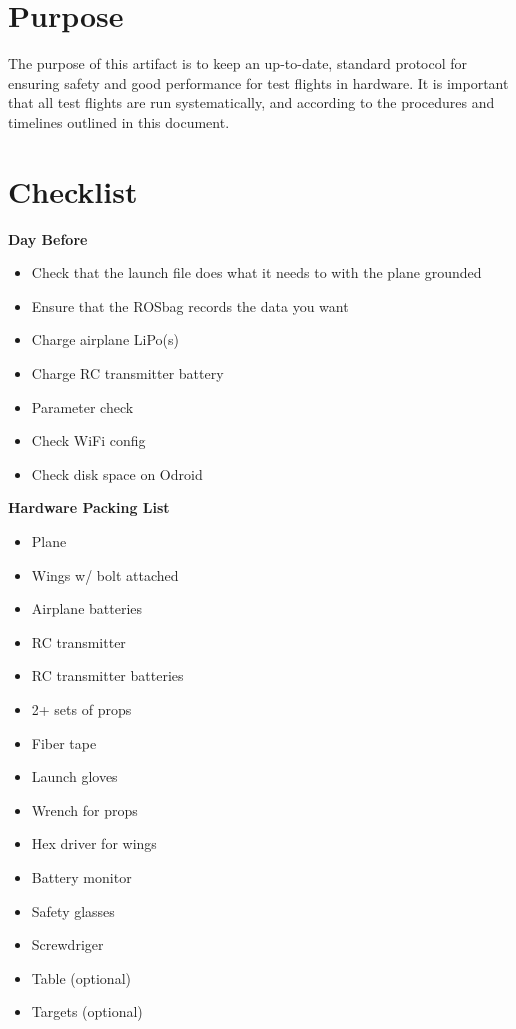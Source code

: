 \documentclass[]{auvsi_doc}
\begin{document}
\begin{AUVSITitlePage}
\begin{artifacttable}
\end{artifacttable}
\end{AUVSITitlePage}

\section{Purpose}

The purpose of this artifact is to keep an up-to-date, standard protocol for ensuring safety and good performance for test flights in hardware. It is important that all test flights are run systematically, and according to the procedures and timelines outlined in this document.

\section{Checklist}

\textbf{Day Before}
\begin{itemize}
	\item Check that the launch file does what it needs to with the plane grounded
	\item Ensure that the ROSbag records the data you want
	\item Charge airplane LiPo(s)
	\item Charge RC transmitter battery
	\item Parameter check
	\item Check WiFi config
	\item Check disk space on Odroid
\end{itemize}

\hrulefill

\textbf{Hardware Packing List}
\begin{itemize}
	\item Plane
	\item Wings w/ bolt attached
	\item Airplane batteries
	\item RC transmitter
	\item RC transmitter batteries
	\item 2+ sets of props
	\item Fiber tape
	\item Launch gloves
	\item Wrench for props
	\item Hex driver for wings
	\item Battery monitor
	\item Safety glasses
	\item Screwdriger
	\item Table (optional)
	\item Targets (optional)
\end{itemize}
\end{document}
